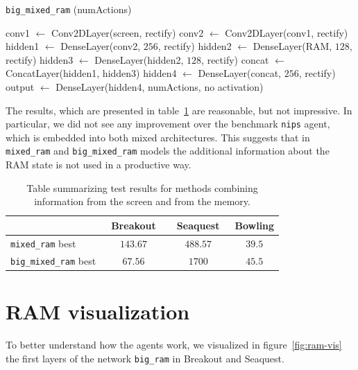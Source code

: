 \begin{algorithm}[H]
\caption{\texttt{big\_mixed\_ram} (numActions)}

\SetAlgoVlined
\DontPrintSemicolon

\vspace{0.05cm}

conv1 $\leftarrow$ Conv2DLayer(screen, rectify)\;
conv2 $\leftarrow$ Conv2DLayer(conv1, rectify)\;
hidden1 $\leftarrow$ DenseLayer(conv2, $256$, rectify)\;
hidden2 $\leftarrow$ DenseLayer(RAM, $128$, rectify)\;
hidden3 $\leftarrow$ DenseLayer(hidden2, $128$, rectify)\;
concat $\leftarrow$ ConcatLayer(hidden1, hidden3)\;
hidden4 $\leftarrow$ DenseLayer(concat, $256$, rectify)\;
output $\leftarrow$ DenseLayer(hidden4, numActions, no activation)\;

\end{algorithm}

The results, which are presented in table~\ref{table:mixed} are reasonable, but not impressive. In particular, we did not see any improvement over the benchmark \texttt{nips} agent, which is embedded into both mixed architectures. This suggests that in \texttt{mixed\_ram} and \texttt{big\_mixed\_ram} models the additional information about the RAM state is not used in a productive way.

\begin{table}[h]
\centering
\begin{tabularx}{0.7\textwidth}{ X c c c }
  \toprule
  &\ Breakout\ &\ Seaquest\ & Bowling \\
  \midrule
  \texttt{mixed\_ram} best & $143.67$ & $488.57$ & $39.5$\\
  \texttt{big\_mixed\_ram} best  & $67.56$ & $1700$ & $45.5$\\
  \bottomrule
\end{tabularx}
\caption{Table summarizing test results for methods combining information from the screen and from the memory.}
\label{table:mixed}
\end{table}

\section{RAM visualization}
To better understand how the agents work, we visualized in figure~\ref{fig:ram-vis} the first layers of the network \texttt{big\_ram} in Breakout and Seaquest. 

